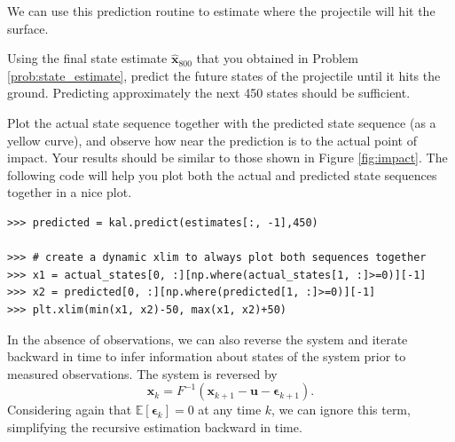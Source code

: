 We can use this prediction routine to estimate where the projectile will hit the surface.
\begin{problem}
Using the final state estimate $\widehat{\mathbf{x}}_{800}$ that you obtained in Problem \ref{prob:state_estimate}, predict the future states of the projectile until it hits the ground.
Predicting approximately the next 450 states should be sufficient.

Plot the actual state sequence together with the predicted state sequence (as a yellow curve), and observe how near the prediction is to the actual point of impact.
Your results should be similar to those shown in Figure \ref{fig:impact}.
The following code will help you plot both the actual and predicted state sequences together in a nice plot.
\begin{lstlisting}
>>> predicted = kal.predict(estimates[:, -1],450)

>>> # create a dynamic xlim to always plot both sequences together
>>> x1 = actual_states[0, :][np.where(actual_states[1, :]>=0)][-1]
>>> x2 = predicted[0, :][np.where(predicted[1, :]>=0)][-1]
>>> plt.xlim(min(x1, x2)-50, max(x1, x2)+50)
\end{lstlisting}

\end{problem}

In the absence of observations, we can also reverse the system and iterate backward in time to infer information about states of the system prior to measured observations.
The system is reversed by
\begin{equation*}
\mathbf{x}_{k} = F^{-1}(\mathbf{x}_{k+1} - \mathbf{u} - \boldsymbol{\epsilon}_{k+1}).
\end{equation*}
Considering again that $\mathbb{E}\left[\boldsymbol{\epsilon}_{k}\right] = 0$ at any time $k$, we can ignore this term, simplifying the recursive estimation backward in time.

